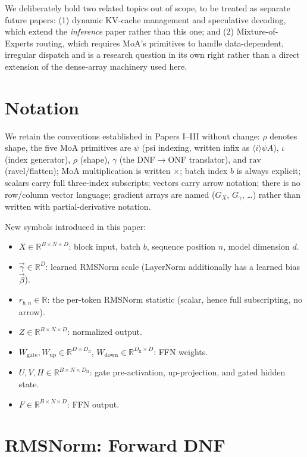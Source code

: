 \documentclass[11pt]{article}
\newcommand{\psii}{\psi}
\newcommand{\iotaop}{\iota}
\newcommand{\gammaop}{\gamma}
\newcommand{\rav}{\mathrm{rav}}
\theoremstyle{definition}
\begin{document}
We deliberately hold two related topics out of scope, to be treated as
separate future papers: (1) dynamic KV-cache management and speculative
decoding, which extend the \emph{inference} paper rather than this one;
and (2) Mixture-of-Experts routing, which requires MoA's primitives to
handle data-dependent, irregular dispatch and is a research question in
its own right rather than a direct extension of the dense-array
machinery used here.

\section{Notation}

We retain the conventions established in Papers I--III without change:
$\rho$ denotes shape, the five MoA primitives are $\psii$ (psi
indexing, written infix as $\langle i \rangle \psii A$), $\iotaop$
(index generator), $\rho$ (shape), $\gammaop$ (the DNF$\to$ONF
translator), and $\rav$ (ravel/flatten); MoA multiplication is written
$\times$; batch index $b$ is always explicit; scalars carry full
three-index subscripts; vectors carry arrow notation; there is no
row/column vector language; gradient arrays are named ($G_X$, $G_\gamma$,
\ldots) rather than written with partial-derivative notation.

New symbols introduced in this paper:
\begin{itemize}
  \item $X \in \mathbb{R}^{B\times N\times D}$: block input, batch $b$,
  sequence position $n$, model dimension $d$.
  \item $\vec{\gamma} \in \mathbb{R}^D$: learned RMSNorm scale (LayerNorm
  additionally has a learned bias $\vec\beta$).
  \item $r_{b,n} \in \mathbb{R}$: the per-token RMSNorm statistic
  (scalar, hence full subscripting, no arrow).
  \item $Z \in \mathbb{R}^{B\times N\times D}$: normalized output.
  \item $W_{\mathrm{gate}}, W_{\mathrm{up}} \in \mathbb{R}^{D\times
  D_{\mathrm{ff}}}$, $W_{\mathrm{down}} \in \mathbb{R}^{D_{\mathrm{ff}}
  \times D}$: FFN weights.
  \item $U, V, H \in \mathbb{R}^{B\times N \times D_{\mathrm{ff}}}$:
  gate pre-activation, up-projection, and gated hidden state.
  \item $F \in \mathbb{R}^{B\times N\times D}$: FFN output.
\end{itemize}

\section{RMSNorm: Forward DNF}
\end{document}
